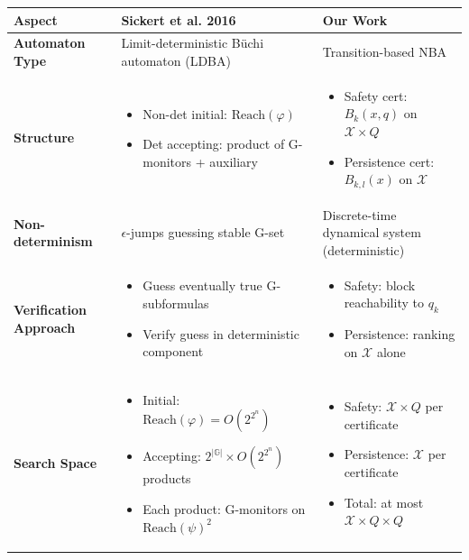 \documentclass{article}
\begin{document}
\begin{center}
\begin{tabular}{|p{3.5cm}|p{5.5cm}|p{5.5cm}|}
\hline
\textbf{Aspect} & \textbf{Sickert et al. 2016} & \textbf{Our Work} \\
\hline
\textbf{Automaton Type} & Limit-deterministic Büchi automaton (LDBA) & Transition-based NBA \\
\hline
\textbf{Structure} &
\begin{itemize}
\item Non-det initial: $\text{Reach}(\varphi)$
\item Det accepting: product of G-monitors + auxiliary
\end{itemize} &
\begin{itemize}
\item Safety cert: $B_k(x,q)$ on $\mathcal{X} \times Q$
\item Persistence cert: $B_{k,l}(x)$ on $\mathcal{X}$
\end{itemize} \\
\hline
\textbf{Non-determinism} & $\epsilon$-jumps guessing stable G-set & Discrete-time dynamical system (deterministic) \\
\hline
\textbf{Verification Approach} &
\begin{itemize}
\item Guess eventually true G-subformulas
\item Verify guess in deterministic component
\end{itemize} &
\begin{itemize}
\item Safety: block reachability to $q_k$
\item Persistence: ranking on $\mathcal{X}$ alone
\end{itemize} \\
\hline
\textbf{Search Space} &
\begin{itemize}
\item Initial: $\text{Reach}(\varphi) = O(2^{2^n})$
\item Accepting: $2^{|\mathbb{G}|} \times O(2^{2^n})$ products
\item Each product: G-monitors on $\text{Reach}(\psi)^2$
\end{itemize} &
\begin{itemize}
\item Safety: $\mathcal{X} \times Q$ per certificate
\item Persistence: $\mathcal{X}$ per certificate
\item Total: at most $\mathcal{X} \times Q \times Q$

\end{itemize}
\end{tabular}
\end{center}
\end{document}
